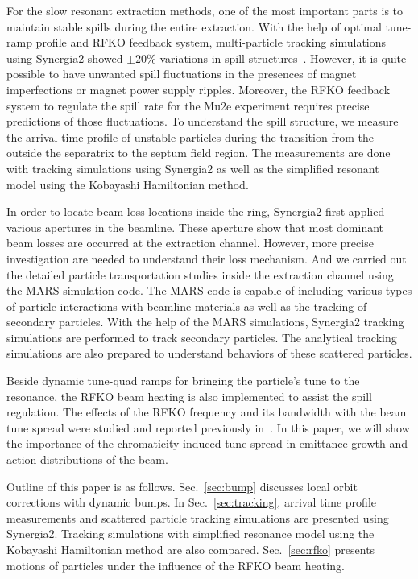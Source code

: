 \documentclass[aps,prstab,onecolumn,preprint]{revtex4-1}
\begin{document}
For the slow resonant extraction methods, one of the most important parts is to maintain stable spills during the entire extraction. With the help of optimal tune-ramp profile and RFKO feedback system, multi-particle tracking simulations using Synergia2 showed \mbox{$\pm 20\%$} variations in spill structures~\cite{mu2e}. However, it is quite possible to have unwanted spill fluctuations in the presences of magnet imperfections or magnet power supply ripples. Moreover, the RFKO feedback system to regulate the spill rate for the Mu2e experiment requires precise predictions of those fluctuations. To understand the spill structure, we measure the arrival time profile of unstable particles during the transition from the outside the separatrix to the septum field region. The measurements are done with tracking simulations using Synergia2 as well as the simplified resonant model using the Kobayashi Hamiltonian method.

In order to locate beam loss locations inside the ring, Synergia2 first applied various apertures in the beamline. These aperture show that most dominant beam losses are occurred at the extraction channel. However, more precise investigation are needed to understand their loss mechanism. And we carried out the detailed particle transportation studies inside the extraction channel using the MARS simulation code. The MARS code is capable of including various types of particle interactions with beamline materials as well as the tracking of secondary particles. With the help of the MARS simulations, Synergia2 tracking simulations are performed to track secondary particles. The analytical tracking simulations are also prepared to understand behaviors of these scattered particles. 

Beside dynamic tune-quad ramps for bringing the particle's tune to the resonance, the RFKO beam heating is also implemented to assist the spill regulation. The effects of the RFKO frequency and its bandwidth with the beam tune spread were studied and reported previously in~\cite{ipac11}. In this paper, we will show the importance of the chromaticity induced tune spread in emittance growth and action distributions of the beam.

Outline of this paper is as follows. Sec.~\ref{sec:bump} discusses local orbit corrections with dynamic bumps. In Sec.~\ref{sec:tracking}, arrival time profile measurements and scattered particle tracking simulations are presented using Synergia2. Tracking simulations with simplified resonance model using the Kobayashi Hamiltonian method are also compared. Sec.~\ref{sec:rfko} presents motions of particles under the influence of the RFKO beam heating.
\end{document}
